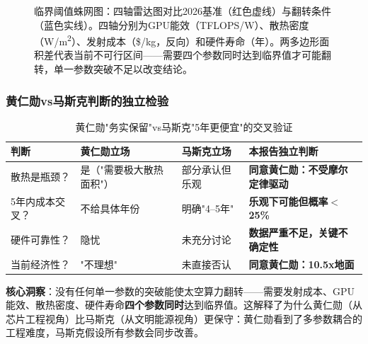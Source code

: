 \begin{figure}[H]
\centering

\caption{临界阈值蛛网图：四轴雷达图对比2026基准（红色虚线）与翻转条件（蓝色实线）。四轴分别为GPU能效（TFLOPS/W）、散热密度（W/m\textsuperscript{2}）、发射成本（\$/kg，反向）和硬件寿命（年）。两多边形面积差代表当前不可行区间——需要四个参数同时达到临界值才可能翻转，单一参数突破不足以改变结论。}
\label{fig:threshold_radar}
\end{figure}

\subsubsection{黄仁勋vs马斯克判断的独立检验}

\begin{table}[H]
\centering
\caption{黄仁勋"务实保留"vs马斯克"5年更便宜"的交叉验证}
\label{tab:huang_vs_musk}
\small
\begin{tabular}{p{2.0cm}p{4.0cm}p{3.5cm}p{4.0cm}}
\toprule
\textbf{判断} & \textbf{黄仁勋立场} & \textbf{马斯克立场} & \textbf{本报告独立判断} \\
\midrule
散热是瓶颈？ & 是（"需要极大散热面积"） & 部分承认但乐观 & \textbf{同意黄仁勋：不受摩尔定律驱动} \\
\hline
5年内成本交叉？ & 不给具体年份 & 明确"4--5年" & \textbf{乐观下可能但概率$<$25\%} \\
\hline
硬件可靠性？ & 隐忧 & 未充分讨论 & \textbf{数据严重不足，关键不确定性} \\
\hline
当前经济性？ & "不理想" & 未直接否认 & \textbf{同意黄仁勋：10.5x地面} \\
\bottomrule
\end{tabular}
\end{table}

\textbf{核心洞察}：没有任何单一参数的突破能使太空算力翻转——需要发射成本、GPU能效、散热密度、硬件寿命\textbf{四个参数同时}达到临界值。这解释了为什么黄仁勋（从芯片工程视角）比马斯克（从文明能源视角）更保守：黄仁勋看到了多参数耦合的工程难度，马斯克假设所有参数会同步改善。

